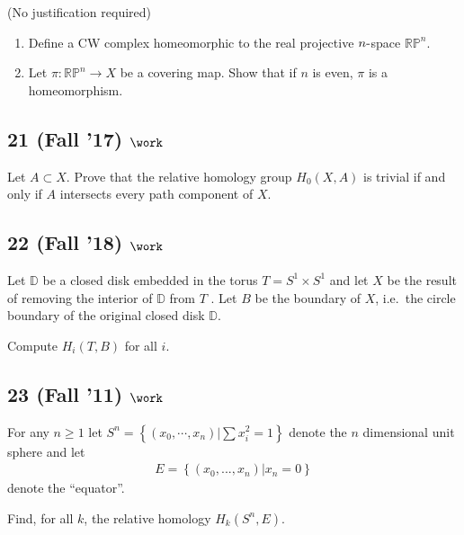 (No justification required)

\begin{enumerate}
\def\labelenumi{\alph{enumi}.}
\setcounter{enumi}{1}
\item
  Define a CW complex homeomorphic to the real projective
  \(n{\hbox{-}}\)space \({\mathbb{RP}}^n\).
\item
  Let \(\pi : {\mathbb{RP}}^n \to X\) be a covering map. Show that if
  \(n\) is even, \(\pi\) is a homeomorphism.
\end{enumerate}

\hypertarget{fall-17-work-3}{%
\subsection{\texorpdfstring{21 (Fall '17)
\(\work\)}{21 (Fall '17) \textbackslash work}}\label{fall-17-work-3}}

Let \(A \subset X\). Prove that the relative homology group
\(H_0 (X, A)\) is trivial if and only if \(A\) intersects every path
component of \(X\).

\hypertarget{fall-18-work-7}{%
\subsection{\texorpdfstring{22 (Fall '18)
\(\work\)}{22 (Fall '18) \textbackslash work}}\label{fall-18-work-7}}

Let \({\mathbb{D}}\) be a closed disk embedded in the torus
\(T = S^1 \times S^1\) and let \(X\) be the result of removing the
interior of \({\mathbb{D}}\) from \(T\) . Let \(B\) be the boundary of
\(X\), i.e.~the circle boundary of the original closed disk
\({\mathbb{D}}\).

Compute \(H_i (T, B)\) for all \(i\).

\hypertarget{fall-11-work-1}{%
\subsection{\texorpdfstring{23 (Fall '11)
\(\work\)}{23 (Fall '11) \textbackslash work}}\label{fall-11-work-1}}

For any \(n \geq 1\) let
\(S^n = \left\{{(x_0 , \cdots , x_n )\mathrel{\Big|}\sum x_i^2 =1}\right\}\)
denote the \(n\) dimensional unit sphere and let
\begin{align*}E = \left\{{(x_0 , . . . , x_n )\mathrel{\Big|}x_n = 0}\right\}\end{align*}
denote the ``equator''.

Find, for all \(k\), the relative homology \(H_k (S^n , E)\).


